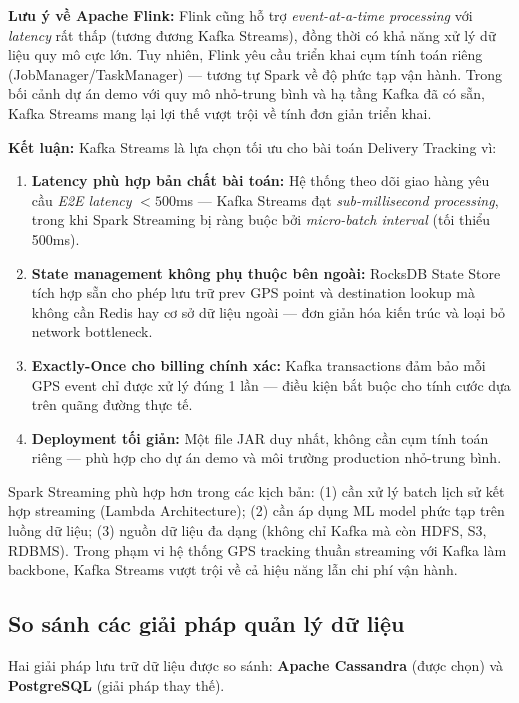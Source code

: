 \bigskip
\noindent
\textbf{Lưu ý về Apache Flink:} Flink cũng hỗ trợ \textit{event-at-a-time processing} với \textit{latency} rất thấp (tương đương Kafka Streams), đồng thời có khả năng xử lý dữ liệu quy mô cực lớn. Tuy nhiên, Flink yêu cầu triển khai cụm tính toán riêng (JobManager/TaskManager) — tương tự Spark về độ phức tạp vận hành. Trong bối cảnh dự án demo với quy mô nhỏ-trung bình và hạ tầng Kafka đã có sẵn, Kafka Streams mang lại lợi thế vượt trội về tính đơn giản triển khai.

\bigskip
\noindent
\textbf{Kết luận:} Kafka Streams là lựa chọn tối ưu cho bài toán Delivery Tracking vì:
\begin{enumerate}
    \item \textbf{Latency phù hợp bản chất bài toán:} Hệ thống theo dõi giao hàng yêu cầu \textit{E2E latency} $< 500$ms — Kafka Streams đạt \textit{sub-millisecond processing}, trong khi Spark Streaming bị ràng buộc bởi \textit{micro-batch interval} (tối thiểu 500ms).
    \item \textbf{State management không phụ thuộc bên ngoài:} RocksDB State Store tích hợp sẵn cho phép lưu trữ prev GPS point và destination lookup mà không cần Redis hay cơ sở dữ liệu ngoài — đơn giản hóa kiến trúc và loại bỏ network bottleneck.
    \item \textbf{Exactly-Once cho billing chính xác:} Kafka transactions đảm bảo mỗi GPS event chỉ được xử lý đúng 1 lần — điều kiện bắt buộc cho tính cước dựa trên quãng đường thực tế.
    \item \textbf{Deployment tối giản:} Một file JAR duy nhất, không cần cụm tính toán riêng — phù hợp cho dự án demo và môi trường production nhỏ-trung bình.
\end{enumerate}

Spark Streaming phù hợp hơn trong các kịch bản: (1) cần xử lý batch lịch sử kết hợp streaming (Lambda Architecture); (2) cần áp dụng ML model phức tạp trên luồng dữ liệu; (3) nguồn dữ liệu đa dạng (không chỉ Kafka mà còn HDFS, S3, RDBMS). Trong phạm vi hệ thống GPS tracking thuần streaming với Kafka làm backbone, Kafka Streams vượt trội về cả hiệu năng lẫn chi phí vận hành.

\subsection{So sánh các giải pháp quản lý dữ liệu}
\label{sec:storage-comparison}

Hai giải pháp lưu trữ dữ liệu được so sánh: \textbf{Apache Cassandra} (được chọn) và \textbf{PostgreSQL} (giải pháp thay thế).

